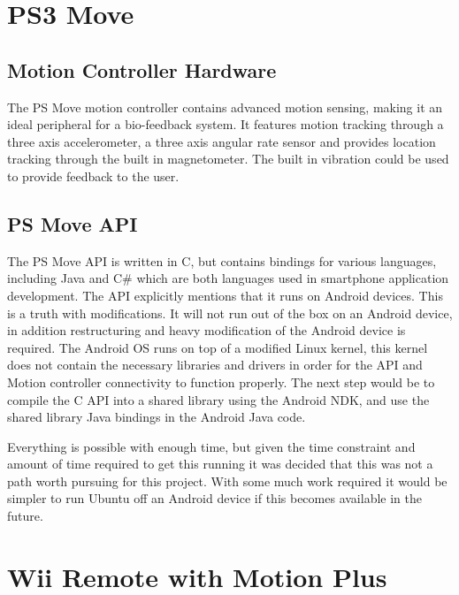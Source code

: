 \documentclass[11pt,twoside,a4paper]{report}
\begin{document}
\section{PS3 Move}

\subsection{Motion Controller Hardware}
The PS Move motion controller contains advanced motion sensing, making it an ideal peripheral for a bio-feedback system. It features motion tracking through a three axis accelerometer, a three axis angular rate sensor and provides location tracking through the built in magnetometer. The built in vibration could be used to provide feedback to the user. %


\subsection{PS Move API}

The PS Move API\cite{PSMoveAPI} is written in C, but contains bindings for various languages, including Java and C\# which are both languages used in smartphone application development. The API explicitly mentions that it runs on Android devices. This is a truth with modifications. It will not run out of the box on an Android device, in addition restructuring and heavy modification of the Android device is required.  The Android OS runs on top of a modified Linux kernel, this kernel does not contain the necessary libraries and drivers in order for the API and Motion controller connectivity to function properly. %
The next step would be to compile the C API into a shared library using the Android NDK, and use the shared library Java bindings in the Android Java code.

Everything is possible with enough time, but given the time constraint and amount of time required to get this running it was decided that this was not a path worth pursuing for this project. With some much work required it would be simpler to run Ubuntu off an Android device if this becomes available in the future. %

\section{Wii Remote with Motion Plus}
\end{document}
